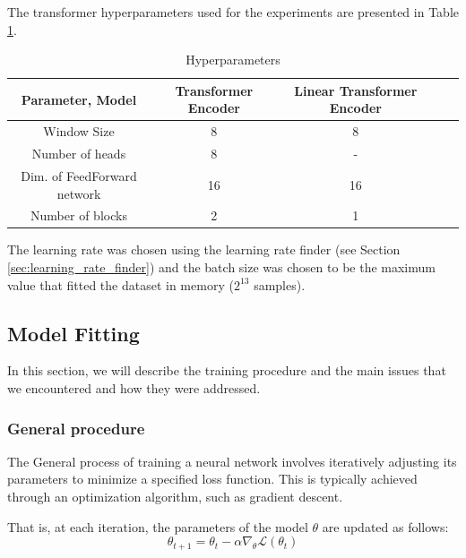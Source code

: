 \documentclass[a4paper, twoside]{report}
\theoremstyle{definition}
\numberwithin{equation}{section}
\begin{document}
The transformer hyperparameters used for the experiments are presented in Table \ref{tab:hyperparameters}.

\begin{table}[h!]
    \centering
    \begin{tabular}{|c|c|c|c|c|}
        \hline
        Parameter, Model            & Transformer Encoder & Linear Transformer Encoder \\
        \hline
        Window Size                 & 8                   & 8                          \\
        Number of heads             & 8                   & -                          \\
        Dim. of FeedForward network & 16                  & 16                         \\
        Number of blocks            & 2                   & 1                          \\
        \hline
    \end{tabular}
    \caption{Hyperparameters}
    \label{tab:hyperparameters}
\end{table}

The learning rate was chosen using the learning rate finder \cite{1506.01186} (see Section \ref{sec:learning_rate_finder})
and the batch size was chosen to be the maximum value that
fitted the dataset in memory ($2^{13}$ samples).


\subsection{Model Fitting} \label{sec:training}

In this section, we will describe the training procedure and the main issues that we encountered and how they were addressed.

\subsubsection{General procedure}

The General process of training a neural network involves iteratively adjusting its
parameters to minimize a specified loss function.
This is typically achieved through an optimization algorithm, such as gradient descent.

That is, at each iteration, the parameters of the model $\theta$ are updated as follows:
\begin{equation} \label{eq:gradient_descent}
    \theta_{t+1}=\theta_t - \alpha \nabla_{\theta} \mathcal{L}(\theta_t)
\end{equation}
\end{document}
